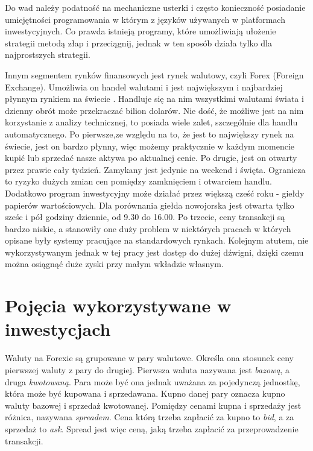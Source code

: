 \documentclass[twoside]{iisthesis}
\begin{document}
Do wad należy podatność na mechaniczne usterki i często konieczność posiadanie umiejętności programowania w którym z języków używanych w platformach inwestycyjnych. Co prawda istnieją programy, które umożliwiają ułożenie strategii metodą złap i przeciągnij, jednak w ten sposób działa tylko dla najprostszych strategii. 

Innym segmentem rynków finansowych jest rynek walutowy, czyli Forex (Foreign Exchange). Umożliwia on handel walutami i jest największym i najbardziej płynnym rynkiem na świecie \cite{forexInvestopedia}. Handluje się na nim wszystkimi walutami świata i dzienny obrót może przekraczać bilion dolarów. Nie dość, że możliwe jest na nim korzystanie z analizy technicznej, to posiada wiele zalet, szczególnie dla handlu automatycznego. Po pierwsze,ze względu na to, że jest to największy rynek na świecie, jest on bardzo płynny, więc możemy praktycznie w każdym momencie kupić lub sprzedać nasze aktywa po aktualnej cenie. Po drugie, jest on otwarty przez prawie cały tydzień. Zamykany jest jedynie na weekend i święta. Ogranicza to ryzyko dużych zmian cen pomiędzy zamknięciem i otwarciem handlu. Dodatkowo program inwestycyjny może działać przez większą cześć roku - giełdy papierów wartościowych. Dla porównania giełda nowojorska jest otwarta tylko sześc i pół godziny dziennie, od 9.30 do 16.00. Po trzecie, ceny transakcji są bardzo niskie, a stanowiły one duży problem w niektórych pracach w których opisane były systemy pracujące na standardowych rynkach. Kolejnym atutem, nie wykorzystywanym jednak w tej pracy jest dostęp do dużej dźwigni, dzięki czemu można osiągnąć duże zyski przy małym wkładzie własnym.

\section{Pojęcia wykorzystywane w inwestycjach}

Waluty na Forexie są grupowane w pary walutowe. Określa ona stosunek ceny pierwszej waluty z pary do drugiej. Pierwsza waluta nazywana jest \textit{bazową}, a druga \textit{kwotowaną}. Para może być ona jednak uważana za pojedynczą jednostkę, która może być kupowana i sprzedawana. Kupno danej pary oznacza kupno waluty bazowej i sprzedaż kwotowanej. Pomiędzy cenami kupna i sprzedaży jest różnica, nazywana \textit{spreadem}. Cena którą trzeba zapłacić za kupno to \textit{bid}, a za sprzedaż to \textit{ask}. Spread jest więc ceną, jaką trzeba zapłacić za przeprowadzenie transakcji.
\end{document}
